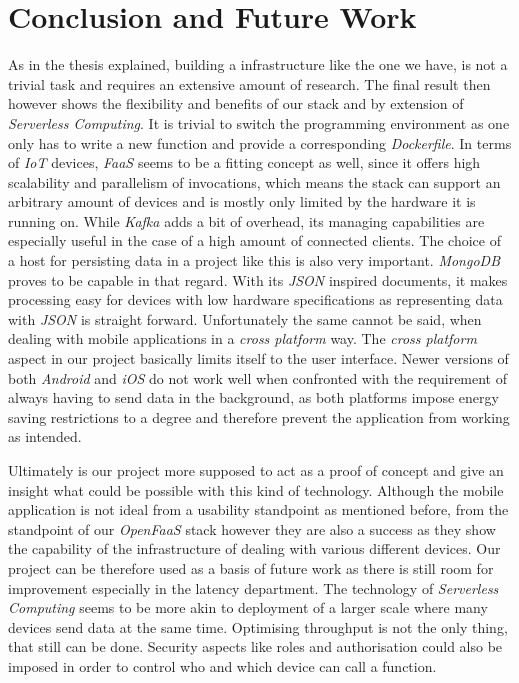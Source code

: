 \section{Conclusion and Future Work}

As in the thesis explained, building a infrastructure like the one we have, is not a trivial task
and requires an extensive amount of research. The final result then however shows the flexibility
and benefits of our stack and by extension of \textit{Serverless Computing}. It is trivial to switch
the programming environment as one only has to write a new function and provide a corresponding
\textit{Dockerfile}. In terms of \textit{IoT} devices, \textit{FaaS} seems to be a fitting concept
as well, since it offers high scalability and parallelism of invocations, which means the stack can
support an arbitrary amount of devices and is mostly only limited by the hardware it is running on.
While \textit{Kafka} adds a bit of overhead, its managing capabilities are especially useful in the
case of a high amount of connected clients. The choice of a host for persisting data in a project
like this is also very important. \textit{MongoDB} proves to be capable in that regard. With its
\textit{JSON} inspired documents, it makes processing easy for devices with low hardware
specifications as representing data with \textit{JSON} is straight forward. Unfortunately the same
cannot be said, when dealing with mobile applications in a \textit{cross platform} way. The
\textit{cross platform} aspect in our project basically limits itself to the user interface. Newer
versions of both \textit{Android} and \textit{iOS} do not work well when confronted with the
requirement of always having to send data in the background, as both platforms impose energy saving
restrictions to a degree and therefore prevent the application from working as intended.

Ultimately is our project more supposed to act as a proof of concept and give an insight what could
be possible with this kind of technology. Although the mobile application is not ideal from a
usability standpoint as mentioned before, from the standpoint of our \textit{OpenFaaS} stack however
they are also a success as they show the capability of the infrastructure of dealing with various
different devices. Our project can be therefore used as a basis of future work as there is still
room for improvement especially in the latency department. The technology of \textit{Serverless
Computing} seems to be more akin to deployment of a larger scale where many devices send data at the
same time. Optimising throughput is not the only thing, that still can be done. Security aspects
like roles and authorisation could also be imposed in order to control who and which device can call
a function.
